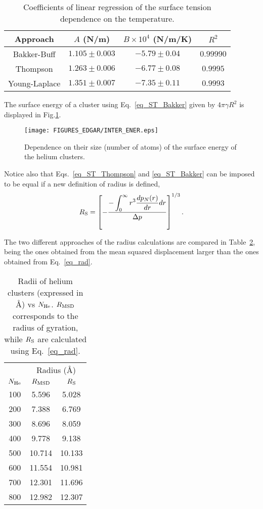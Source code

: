 \documentclass[jcp,amsmath,amssymb,preprint]{revtex4-1}
\begin{document}
\begin{table}[]
    \centering
    \begin{tabular}{c|ccc}
         Approach & $A$ (N/m) & $B\times10^4$ (N/m/K) & $R^2$ \\ \hline
         Bakker-Buff & $1.105 \pm 0.003$ & $-5.79 \pm 0.04$ & $0.99990$ \\
         Thompson & $1.263 \pm 0.006$ & $-6.77 \pm 0.08$ & $0.9995$ \\
         Young-Laplace & $1.351 \pm 0.007$ & $-7.35 \pm 0.11 $ & $0.9993$ \\
    \end{tabular}
    \caption{Coefficients of linear regression of the surface tension dependence on the temperature.}
    \label{linfits}
\end{table}

The surface energy of a cluster using Eq.~\ref{eq_ST_Bakker} given by 
$\displaystyle 4 \pi \gamma R^2$ is displayed in Fig.\ref{fig:INTER_ENER}.

\begin{figure}
            \centering
            \texttt{[image: FIGURES\_EDGAR/INTER\_ENER.eps]}
            \caption{Dependence on their size (number of atoms) of the surface energy of the helium clusters.}
            \label{fig:INTER_ENER}
\end{figure}

Notice also that Eqs.~\ref{eq_ST_Thompson} and \ref{eq_ST_Bakker} can be imposed to be equal if a new definition of radius is defined,
\begin{equation} \label{eq_rad}
    R_{\rm S} = \left[ -\frac{\displaystyle -\int_0^\infty r^3 \frac{dp_N(r)}{dr} dr}{\Delta p} \right]^{1/3} . 
\end{equation} 

The two different approaches of the radius calculations are compared in Table~\ref{tab_radius}, being the ones obtained from the mean squared displacement larger than the ones obtained from Eq.~\ref{eq_rad}.
\begin{table}[]
    \centering
    \begin{tabular}{c|cc} \hline \hline
         ~ &  \multicolumn{2}{c}{Radius (\AA)} \\ \cline{2-3}
         $N_{\rm He}$ & $R_{\rm MSD}$ & $R_{\rm S}$ \\ \hline
         100 & 5.596 & 5.028  \\ 
         200 & 7.388 & 6.769 \\
         300 & 8.696 & 8.059 \\
         400 & 9.778 & 9.138 \\
         500 & 10.714 & 10.133 \\
         600 & 11.554 & 10.981 \\
         700 & 12.301 & 11.696 \\
         800 & 12.982 & 12.307 \\ \hline \hline
    \end{tabular}
    \caption{Radii of helium clusters (expressed in \AA) vs $N_{\rm He}$. $R_{\rm MSD}$ corresponds to the radius of gyration, while $R_{\rm S}$ are calculated using Eq.~\ref{eq_rad}.}
    \label{tab_radius}
\end{table}


\newpage
%


\end{document}
